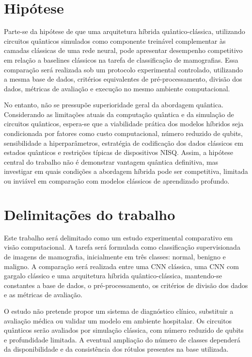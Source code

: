 \documentclass[
    12pt,
    openright,
    oneside,
    a4paper,
    english,
    brazil
]{abntex2}
\begin{document}
\section{Hipótese}

Parte-se da hipótese de que uma arquitetura híbrida quântico-clássica, utilizando circuitos quânticos simulados como componente treinável complementar às camadas clássicas de uma rede neural, pode apresentar desempenho competitivo em relação a baselines clássicos na tarefa de classificação de mamografias. Essa comparação será realizada sob um protocolo experimental controlado, utilizando a mesma base de dados, critérios equivalentes de pré-processamento, divisão dos dados, métricas de avaliação e execução no mesmo ambiente computacional.

No entanto, não se pressupõe superioridade geral da abordagem quântica. Considerando as limitações atuais da computação quântica e da simulação de circuitos quânticos, espera-se que a viabilidade prática dos modelos híbridos seja condicionada por fatores como custo computacional, número reduzido de qubits, sensibilidade a hiperparâmetros, estratégia de codificação dos dados clássicos em estados quânticos e restrições típicas de dispositivos NISQ. Assim, a hipótese central do trabalho não é demonstrar vantagem quântica definitiva, mas investigar em quais condições a abordagem híbrida pode ser competitiva, limitada ou inviável em comparação com modelos clássicos de aprendizado profundo.

\section{Delimitações do trabalho}

Este trabalho será delimitado como um estudo experimental comparativo em visão computacional. A tarefa será formulada como classificação supervisionada de imagens de mamografia, inicialmente em três classes: normal, benigno e maligno. A comparação será realizada entre uma CNN clássica, uma CNN com gargalo clássico e uma arquitetura híbrida quântico-clássica, mantendo-se constantes a base de dados, o pré-processamento, os critérios de divisão dos dados e as métricas de avaliação.

O estudo não pretende propor um sistema de diagnóstico clínico, substituir a avaliação médica ou validar um modelo em ambiente hospitalar. Os circuitos quânticos serão avaliados por simulação clássica, com número reduzido de qubits e profundidade limitada. A eventual ampliação do número de classes dependerá da disponibilidade e da consistência dos rótulos presentes na base utilizada.
\end{document}
